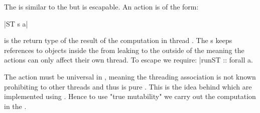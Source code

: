 \documentclass[thesis-solanki.tex]{subfiles}
\begin{document}

The  is similar to the  but is escapable.
An  action  is of the form:

|ST s a|

 is the return type of the result of the computation in thread .
The s keeps references to objects inside the  from leaking to the outside of the
 meaning the actions can only affect their own thread.
To escape we require:
|runST :: forall a.

The action  must be universal in , meaning the threading association is not known
prohibiting to other threads and thus  is pure \cite{website:stmonadwiki,
  website:stmonadstackoverflow}.
This is the idea behind  which are implemented using .
Hence to use "true mutability" we carry out the computation in the .
\end{document}
